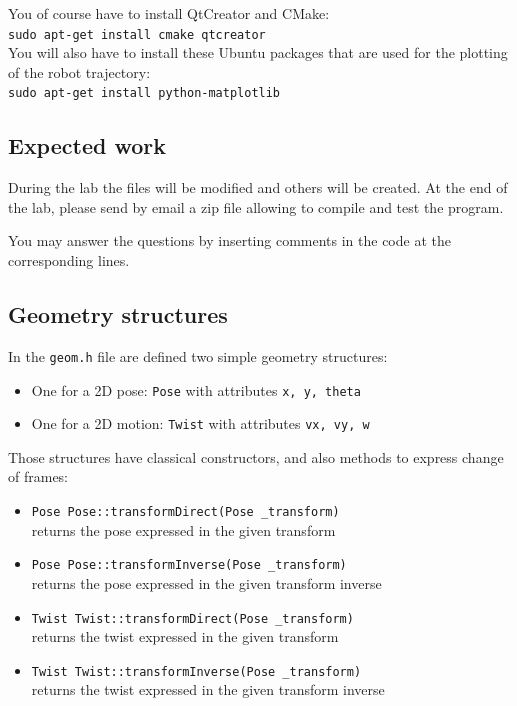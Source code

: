 \documentclass{ecnreport}
\begin{document}
You of course have to install QtCreator and CMake:\\
\texttt{sudo apt-get install cmake qtcreator} \\

You will also have to install these Ubuntu packages that are used for the plotting of the robot trajectory:\\
\texttt{sudo apt-get install python-matplotlib}

\subsection{Expected work}

During the lab the files will be modified and others will be created.
At the end of the lab, please send by email a zip file allowing to compile and test the program.

You may answer the questions by inserting comments in the code at the corresponding lines.

\subsection{Geometry structures}

In the \texttt{geom.h} file are defined two simple geometry structures:
\begin{itemize}
 \item One for a 2D pose: \texttt{Pose} with attributes \texttt{x, y, theta}
 \item One for a 2D motion: \texttt{Twist} with attributes \texttt{vx, vy, w} 
\end{itemize}Those structures have classical constructors, and also methods to express change of frames:
\begin{itemize}
 \item \texttt{Pose Pose::transformDirect(Pose \_transform)} \\returns the pose  expressed in the given transform
 \item \texttt{Pose Pose::transformInverse(Pose \_transform)}\\ returns the pose expressed in the given transform inverse
 \item \texttt{Twist Twist::transformDirect(Pose \_transform)} \\returns the twist expressed in the given transform
 \item \texttt{Twist Twist::transformInverse(Pose \_transform)}\\ returns the twist expressed in the given transform inverse
 \end{itemize}
\end{document}
